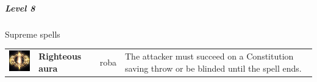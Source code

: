 \subparagraph{Level 8} 
Supreme spells \\
\begin{tabular}{ m{2cm}m{3cm}m{4cm}m{6cm} } 
	\includegraphics[width=2cm]{../Pictures/Gameplay/Spells/Icon/Righteous_aura_spell_icon.png} & \textbf{Righteous aura} & roba & The attacker must succeed on a Constitution saving throw or be blinded until the spell ends. \\ %
\end{tabular}

\pagebreak













